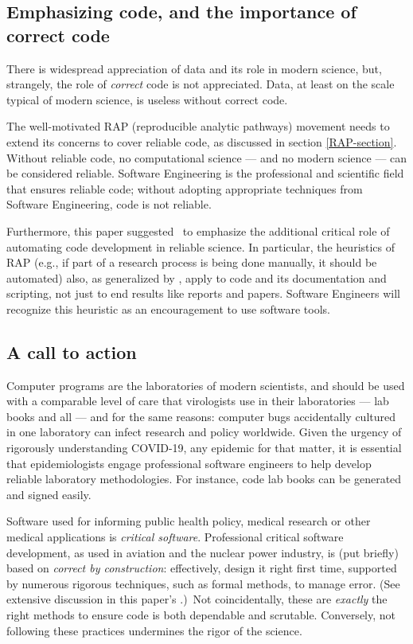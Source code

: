 \documentclass{comjnl}
\begin{document}
\subsection{Emphasizing code, and the importance of correct code}
There is widespread appreciation of data and its role in modern science, but, strangely, the role of \emph{correct\/} code is not appreciated. Data, at least on the scale typical of modern science, is useless without correct code.

The well-motivated RAP (reproducible analytic pathways) movement needs to extend its concerns to cover reliable code, as discussed in section \ref{RAP-section}. Without reliable code, no computational science --- and no modern science --- can be considered reliable. Software Engineering is the professional and scientific field that ensures reliable code; without adopting appropriate techniques from Software Engineering, code is not reliable. 

Furthermore, this paper suggested \RAPstar\ to emphasize the additional critical role of automating code development in reliable science. In particular, the heuristics of RAP (e.g., if part of a research process is being done manually, it should be automated) also, as generalized by \RAPstarp, apply to code and its documentation and scripting, not just to end results like reports and papers. Software Engineers will recognize this heuristic as an encouragement to use software tools.

\subsection{A call to action}\label{summary}
Computer programs are the laboratories of modern scientists, and should be used with a comparable level of care that virologists use in their laboratories --- lab books and all \cite{notebooks} --- and for the same reasons: computer bugs accidentally cultured in one laboratory can infect research and policy worldwide. Given the urgency of rigorously understanding COVID-19, any epidemic for that matter, it is essential that epidemiologists engage professional software engineers to help develop reliable laboratory methodologies. For instance, code lab books can be generated and signed easily.

Software used for informing public health policy, medical research or other medical applications is \emph{critical software}. Professional critical software development, as used in aviation and the nuclear power industry, is (put briefly) based on \emph{correct by construction}: \cite{cbc} effectively, design it right first time, {supported by numerous rigorous techniques, such as formal methods, to manage error. (See extensive discussion in this paper's \supplement.)}\ Not coincidentally, these are \emph{exactly\/} the right methods to ensure code is both dependable and scrutable. Conversely, not following these practices undermines the rigor of the science.
\end{document}
